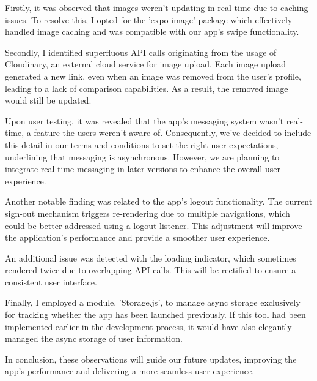 Firstly, it was observed that images weren't updating in real time due to caching issues. To resolve this, I opted for the 'expo-image' package which effectively handled image caching and was compatible with our app's swipe functionality.

Secondly, I identified superfluous API calls originating from the usage of Cloudinary, an external cloud service for image upload. Each image upload generated a new link, even when an image was removed from the user's profile, leading to a lack of comparison capabilities. As a result, the removed image would still be updated.

Upon user testing, it was revealed that the app's messaging system wasn't real-time, a feature the users weren't aware of. Consequently, we've decided to include this detail in our terms and conditions to set the right user expectations, underlining that messaging is asynchronous. However, we are planning to integrate real-time messaging in later versions to enhance the overall user experience.

Another notable finding was related to the app's logout functionality. The current sign-out mechanism triggers re-rendering due to multiple navigations, which could be better addressed using a logout listener. This adjustment will improve the application's performance and provide a smoother user experience.

An additional issue was detected with the loading indicator, which sometimes rendered twice due to overlapping API calls. This will be rectified to ensure a consistent user interface.

Finally, I employed a module, 'Storage.js', to manage async storage exclusively for tracking whether the app has been launched previously. If this tool had been implemented earlier in the development process, it would have also elegantly managed the async storage of user information.

In conclusion, these observations will guide our future updates, improving the app's performance and delivering a more seamless user experience.
